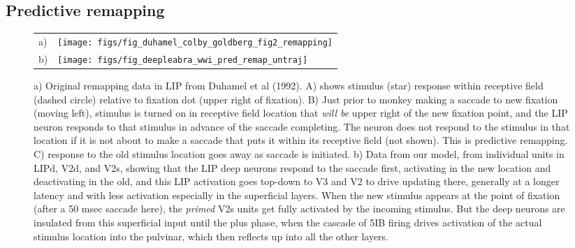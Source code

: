 \documentclass[11pt,twoside]{article}
\newif\myifpdf
\begin{document}
\subsection{Predictive remapping}

\begin{figure}
  \begin{center}
    \begin{tabular}{ll}
      \parbox[b]{.1em}{a) \vspace*{1.4in}} &
      \texttt{[image: figs/fig\_duhamel\_colby\_goldberg\_fig2\_remapping]} \\
      \parbox[b]{.1em}{b) \vspace*{1.4in}} &
      \texttt{[image: figs/fig\_deepleabra\_wwi\_pred\_remap\_untraj]}
    \end{tabular}
  \end{center}
  \caption{\footnotesize a) Original remapping data in LIP from Duhamel et al (1992).  A) shows stimulus (star) response within receptive field (dashed circle) relative to fixation dot (upper right of fixation).  B) Just prior to monkey making a saccade to new fixation (moving left), stimulus is turned on in receptive field location that {\em will be} upper right of the new fixation point, and the LIP neuron responds to that stimulus in advance of the saccade completing.  The neuron does not respond to the stimulus in that location if it is not about to make a saccade that puts it within its receptive field (not shown).  This is predictive remapping.  C) response to the old stimulus location goes away as saccade is initiated.  b) Data from our model, from individual units in LIPd, V2d, and V2s, showing that the LIP deep neurons respond to the saccade first, activating in the new location and deactivating in the old, and this LIP activation goes top-down to V3 and V2 to drive updating there, generally at a longer latency and with less activation especially in the superficial layers.  When the new stimulus appears at the point of fixation (after a 50 msec saccade here), the {\em primed} V2s units get fully activated by the incoming stimulus.  But the deep neurons are insulated from this superficial input until the plus phase, when the cascade of 5IB firing drives activation of the actual stimulus location into the pulvinar, which then reflects up into all the other layers.}
  \label{fig.remap_units}
\end{figure}
\end{document}
